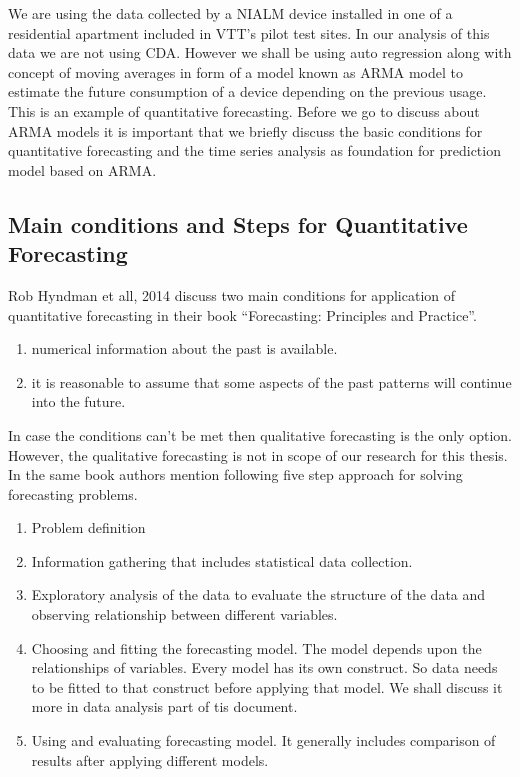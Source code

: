We are using the data collected by a NIALM device installed in one of a residential apartment included in VTT's pilot test sites. In our analysis of this data we are not using CDA. However we shall be using auto regression along with concept of moving averages in form of a model known as ARMA model to estimate the future consumption of a device depending on the previous usage. This is an example of quantitative forecasting. Before we go to discuss about ARMA models it is important that we briefly discuss the basic conditions for quantitative forecasting and the time series analysis as foundation for prediction model based on ARMA.
\subsection{Main conditions and Steps for Quantitative Forecasting}\label{conditions}
Rob Hyndman et all, 2014 discuss two main conditions for application of quantitative forecasting\cite{hyndman2014forecasting} in their book ``Forecasting: Principles and Practice''.
\begin{enumerate}
\item numerical information about the past is available.
\item it is reasonable to assume that some aspects of the past patterns will continue into the future.
\end{enumerate}
In case the conditions can't be met then qualitative forecasting is the only option. However, the qualitative forecasting is not in scope of our research for this thesis. In the same book authors mention following five step approach for solving forecasting problems.
\begin{enumerate}
\item Problem definition
\item Information gathering that includes statistical data collection.
\item Exploratory analysis of the data to evaluate the structure of the data and observing relationship between different variables.
\item Choosing and fitting the forecasting model. The model depends upon the relationships of variables. Every model has its own construct. So data needs to be fitted to that construct before applying that model. We shall discuss it more in data analysis part of tis document.
\item Using and evaluating forecasting model. It generally includes comparison of results after applying different models.  
\end{enumerate}    

